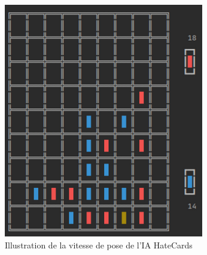 \begin{figure}[h]
    \centering
    \includegraphics[width=\textwidth,angle=0]{./images/HateCards.png}
    \caption{Illustration de la vitesse de pose de l'IA HateCards}
    \label{fig:hate1}
\end{figure}

